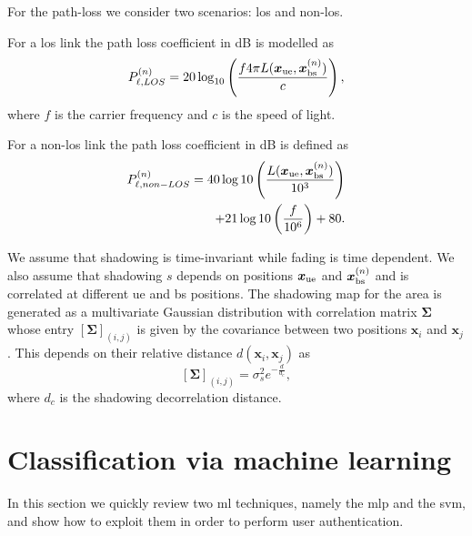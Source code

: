 \documentclass[twocolumns]{IEEEtran}
\begin{document}
For the path-loss we consider two scenarios: \ac{los} and non-\ac{los}.

For a \ac{los} link the path loss coefficient in dB is modelled as
\begin{equation}\label{eq:los}
    P_{\ell,LOS}^{(n)} = 20\log_{10}\left(\frac{f 4\pi L(\bm{x}_{\rm ue},\bm{x}_{\rm bs}^{(n)})}{c}\right),
\end{equation}
where $f$ is the carrier frequency and $c$ is the speed of light.

For a  non-\ac{los} link the path loss coefficient in dB is defined as
\begin{equation}
\begin{split}
    P_{\ell, non-LOS}^{(n)} = 40\log10\left (\frac{L(\bm{x}_{\rm ue},\bm{x}_{\rm bs}^{(n)})}{10^3}\right ) \\
    + 21\log10\left(\frac{f}{10^6}\right) + 80.
    \end{split}
\end{equation}

We assume that shadowing is time-invariant while fading is time dependent. We also assume that shadowing $s$ depends on positions $\bm{x}_{\rm ue}$ and $\bm{x}_{\rm bs}^{(n)}$ and is correlated at different \ac{ue} and \ac{bs} positions. The shadowing map for the area is generated as a multivariate Gaussian distribution with correlation matrix $\bm{\Sigma}$ whose entry $\left[\bm{\Sigma}\right]_{(i,j)}$ is given by the covariance between two positions $\bm{x}_i$ and $\bm{x}_j$. This depends on their relative distance $d(\bm{x}_i,\bm{x}_j)$ as
\begin{equation}\label{eq: coor mat}
    \left[\bm{\Sigma}\right]_{(i,j)} = \sigma_s^2e^{-\frac{d}{d_c}},
\end{equation}
where $d_c$ is the shadowing decorrelation distance. 

\section{Classification via machine learning}
In this section we quickly review two \ac{ml} techniques, namely the \ac{mlp} and the \ac{svm}, and show how to exploit them in order to perform user authentication.
\end{document}
